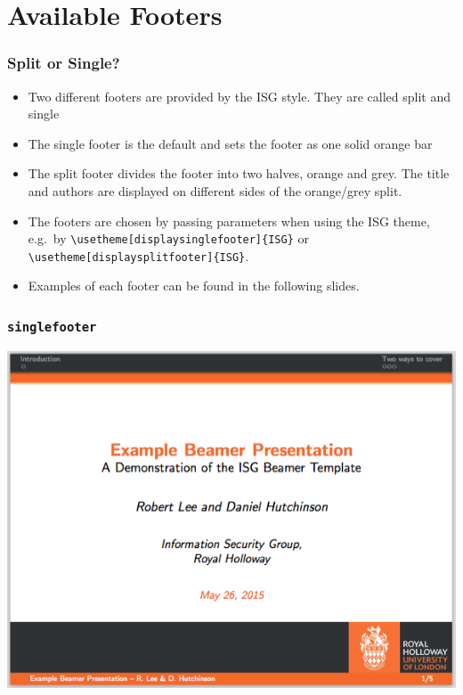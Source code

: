 \documentclass[]{beamer}
\begin{document}
\section{Available Footers}
\begin{frame}\frametitle{Split or Single?}
\begin{itemize}
	\item Two different footers are provided by the ISG style.  They are called split and single
	\item The single footer is the default and sets the footer as one solid orange bar
	\item The split footer divides the footer into two halves, orange and grey.  The title and authors are displayed on different sides of the orange/grey split.
	\item The footers are chosen by passing parameters when using the ISG theme, e.g.\ by \texttt{\textbackslash usetheme[displaysinglefooter]\{ISG\}} or \texttt{\textbackslash usetheme[displaysplitfooter]\{ISG\}}.
	\item Examples of each footer can be found in the following slides.
\end{itemize}
\end{frame}

\begin{frame}\frametitle{\texttt{singlefooter}}
\begin{center}
	\includegraphics[scale=0.4]{graphics/singlefooter.png}
\end{center}
\end{frame}
\end{document}
